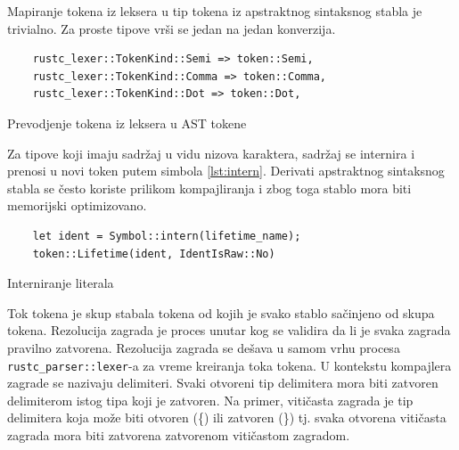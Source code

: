\documentclass[11pt]{article}
\begin{document}
Mapiranje tokena iz leksera u tip tokena iz apstraktnog sintaksnog stabla je trivialno.
Za proste tipove vrši se jedan na jedan konverzija.

\begin{listing}[H]
\begin{verbatim}
    rustc_lexer::TokenKind::Semi => token::Semi,
    rustc_lexer::TokenKind::Comma => token::Comma,
    rustc_lexer::TokenKind::Dot => token::Dot,
\end{verbatim}
\caption{Prevodjenje tokena iz leksera u AST tokene}
\end{listing}
Za tipove koji imaju sadržaj u vidu nizova karaktera, sadržaj se internira i prenosi 
u novi token putem simbola \ref{lst:intern}. Derivati apstraktnog sintaksnog stabla se često koriste prilikom kompajliranja i zbog toga 
stablo mora biti memorijski optimizovano.

\begin{listing}[H]
\begin{verbatim}
    let ident = Symbol::intern(lifetime_name);
    token::Lifetime(ident, IdentIsRaw::No)
\end{verbatim}
\caption{Interniranje literala}
\label{lst:intern}
\end{listing}
Tok tokena je skup stabala tokena od kojih je svako stablo sačinjeno od skupa tokena.  
Rezolucija zagrada je proces unutar kog se validira da li je svaka zagrada pravilno zatvorena.
Rezolucija zagrada se dešava u samom vrhu procesa \verb|rustc_parser::lexer|-a 
za vreme kreiranja toka tokena. U kontekstu kompajlera zagrade se nazivaju delimiteri. 
Svaki otvoreni tip delimitera mora biti zatvoren delimiterom istog tipa koji je zatvoren.
Na primer, vitičasta zagrada je tip delimitera koja može biti otvoren (\{) ili zatvoren (\}) tj.
svaka otvorena vitičasta zagrada mora biti zatvorena zatvorenom vitičastom zagradom.
\end{document}
